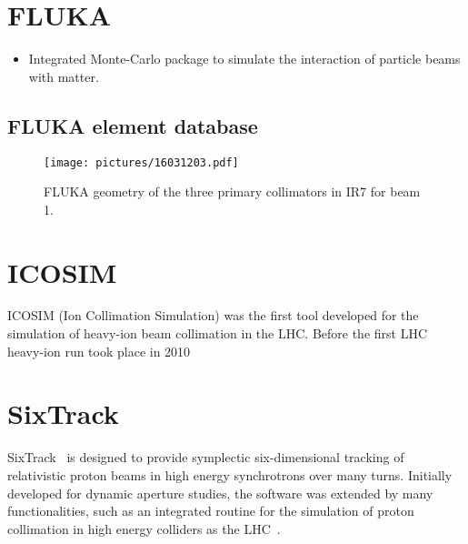 \section{FLUKA}



\begin{itemize}
\item Integrated Monte-Carlo package to simulate the interaction of particle beams with matter. 
\end{itemize}




\subsection{FLUKA element database} \label{chapter:fedb}


\begin{figure}[t]  
    \centering
    \texttt{[image: pictures/16031203.pdf]}
    \caption{FLUKA geometry of the three primary collimators in IR7 for beam 1.}  
    \label{pic:16031201}
\end{figure}



\section{ICOSIM}
ICOSIM (Ion Collimation Simulation) was the first tool developed for the simulation of heavy-ion beam collimation in the LHC. Before the first LHC heavy-ion run took place in 2010  




\section{SixTrack}

SixTrack~\cite{SixTrackref01,SixTrackref02,SixTrackref03,SixTrackref04} is designed to provide symplectic six-dimensional tracking of relativistic proton beams in high energy synchrotrons over many turns. Initially developed for dynamic aperture studies, the software was extended by many functionalities, such as an integrated routine for the simulation of proton collimation in high energy colliders as the LHC~\cite{colltrack}. 



